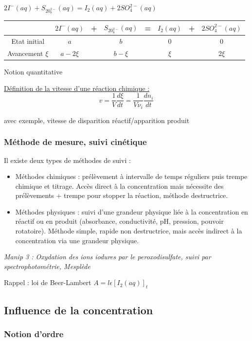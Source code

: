 \documentclass{article}%
\begin{document}
$2 I^-(aq) +S_20_8^{2-}(aq) =I_2(aq) +2 SO_4^{2-}(aq)$

\begin{tabular}{|c|ccccccc|}
\hline
&$2 I^-(aq)$&+&$S_20_8^{2-}(aq)$&=&$I_2(aq)$&+&$2 SO_4^{2-}(aq)$\\
\hline
Etat initial & $a$&& $b$&& 0 && 0\\
Avancement $\xi$ & $a-2\xi$ && $b-\xi$ && $\xi$ && $2\xi$\\
\hline
\end{tabular}

Notion quantitative

\underline{Définition de la vitesse d'une réaction chimique :} \[v=\frac{1}{V}\frac{d\xi}{dt}=\frac{1}{V\nu_i}\frac{d n_i}{dt}\]

avec exemple, vitesse de disparition réactif/apparition produit

\subsubsection{Méthode de mesure, suivi cinétique}

Il existe deux types de méthodes de suivi :

\begin{itemize}
	\item Méthodes chimiques : prélèvement à intervalle de temps réguliers puis trempe chimique et titrage. Accès direct à la concentration mais nécessite des prélèvements + trempe pour stopper la réaction, méthode destructrice.
	\item Méthodes physiques : suivi d'une grandeur physique liée à la concentration en réactif ou en produit (absorbance, conductivité, pH, pression, pouvoir rotatoire). Méthode simple, rapide non destructrice, mais accès indirect à la concentration via une grandeur physique.
\end{itemize}

\textit{Manip 3 : Oxydation des ions iodures par le peroxodisulfate, suivi par spectrophotométrie, Mesplède}

Rappel : loi de Beer-Lambert $A=l\epsilon [I_2(aq)]_t$

\subsection{Influence de la concentration}
\subsubsection{Notion d'ordre}
\end{document}
